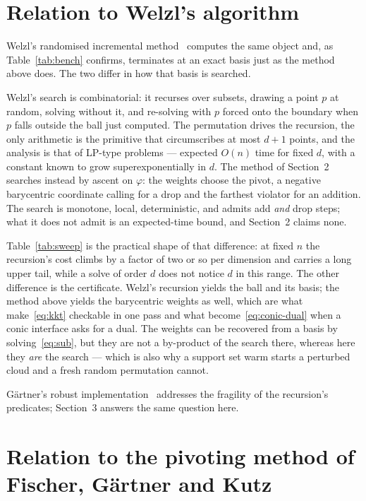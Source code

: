 \documentclass[10pt,a4paper]{article}
\theoremstyle{plain}
\theoremstyle{remark}
\begin{document}
\section{Relation to Welzl's algorithm}

Welzl's randomised incremental method~\cite{welzl1991} computes the same object
and, as Table~\ref{tab:bench} confirms, terminates at an exact basis just as the
method above does. The two differ in how that basis is searched.

Welzl's search is combinatorial: it recurses over subsets, drawing a point $p$ at
random, solving without it, and re-solving with $p$ forced onto the boundary when
$p$ falls outside the ball just computed. The permutation drives the recursion,
the only arithmetic is the primitive that circumscribes at most $d+1$ points, and
the analysis is that of LP-type problems --- expected $O(n)$ time for fixed $d$,
with a constant known to grow superexponentially in $d$. The method of Section~2
searches instead by ascent on $\varphi$: the weights choose the pivot, a negative
barycentric coordinate calling for a drop and the farthest violator for an
addition. The search is monotone, local, deterministic, and admits add
\emph{and} drop steps; what it does not admit is an expected-time bound, and
Section~2 claims none.

Table~\ref{tab:sweep} is the practical shape of that difference: at fixed $n$ the
recursion's cost climbs by a factor of two or so per dimension and carries a long
upper tail, while a solve of order $d$ does not notice $d$ in this range. The
other difference is the certificate. Welzl's recursion yields the ball and its
basis; the method above yields the barycentric weights as well, which are what
make~\eqref{eq:kkt} checkable in one pass and what become~\eqref{eq:conic-dual}
when a conic interface asks for a dual. The weights can be recovered from a basis
by solving~\eqref{eq:sub}, but they are not a by-product of the search there,
whereas here they \emph{are} the search --- which is also why a support set warm
starts a perturbed cloud and a fresh random permutation cannot.

G\"artner's robust implementation~\cite{gaertner1999} addresses the fragility of
the recursion's predicates; Section~3 answers the same question here.

\section{Relation to the pivoting method of Fischer, G\"artner and Kutz}
\end{document}
